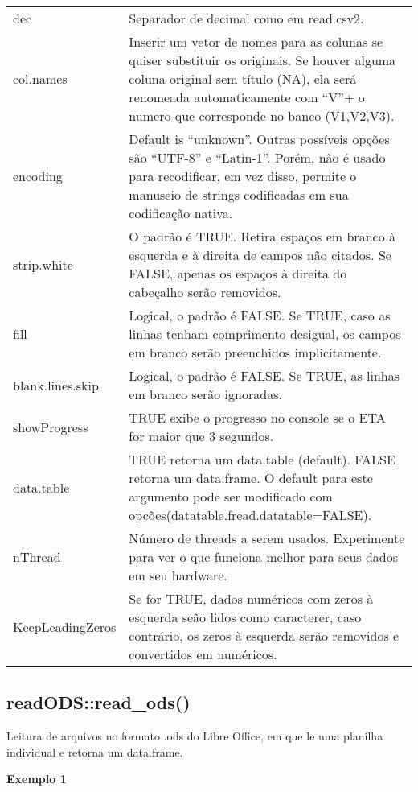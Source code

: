 \documentclass[
]{book}
\theoremstyle{definition}
\theoremstyle{definition}
\theoremstyle{definition}
\theoremstyle{definition}
\theoremstyle{remark}
\begin{document}
\begin{longtable}[]{@{}
  >{\raggedright\arraybackslash}p{}
  >{\raggedright\arraybackslash}p{}@{}}
dec & Separador de decimal como em read.csv2. \\
col.names & Inserir um vetor de nomes para as colunas se quiser substituir os originais. Se houver alguma coluna original sem título (NA), ela será renomeada automaticamente com ``V''+ o numero que corresponde no banco (V1,V2,V3). \\
encoding & Default is ``unknown''. Outras possíveis opções são ``UTF-8'' e ``Latin-1''. Porém, não é usado para recodificar, em vez disso, permite o manuseio de strings codificadas em sua codificação nativa. \\
strip.white & O padrão é TRUE. Retira espaços em branco à esquerda e à direita de campos não citados. Se FALSE, apenas os espaços à direita do cabeçalho serão removidos. \\
fill & Logical, o padrão é FALSE. Se TRUE, caso as linhas tenham comprimento desigual, os campos em branco serão preenchidos implicitamente. \\
blank.lines.skip & Logical, o padrão é FALSE. Se TRUE, as linhas em branco serão ignoradas. \\
showProgress & TRUE exibe o progresso no console se o ETA for maior que 3 segundos. \\
data.table & TRUE retorna um data.table (default). FALSE retorna um data.frame. O default para este argumento pode ser modificado com opcões(datatable.fread.datatable=FALSE). \\
nThread & Número de threads a serem usados. Experimente para ver o que funciona melhor para seus dados em seu hardware. \\
KeepLeadingZeros & Se for TRUE, dados numéricos com zeros à esquerda seão lidos como caracterer, caso contrário, os zeros à esquerda serão removidos e convertidos em numéricos. \\
\bottomrule
\end{longtable}

\hypertarget{readodsread_ods}{%
\subsection{readODS::read\_ods()}\label{readodsread_ods}}

Leitura de arquivos no formato .ods do Libre Office, em que le uma planilha individual e retorna um data.frame.

\textbf{Exemplo 1}
\end{document}
